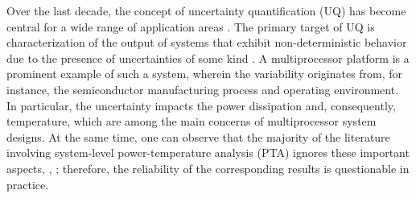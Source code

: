 Over the last decade, the concept of uncertainty quantification (UQ) has become central for a wide range of application areas \cite{xiu2010}. The primary target of UQ is characterization of the output of systems that exhibit non-deterministic behavior due to the presence of uncertainties of some kind \cite{eldred2009}. A multiprocessor platform is a prominent example of such a system, wherein the variability originates from, for instance, the semiconductor manufacturing process and operating environment. In particular, the uncertainty impacts the power dissipation and, consequently, temperature, which are among the main concerns of multiprocessor system designs. At the same time, one can observe that the majority of the literature involving system-level power-temperature analysis (PTA) ignores these important aspects, \eg, \cite{rao2009, rai2011, thiele2011, ukhov2012}; therefore, the reliability of the corresponding results is questionable in practice.

